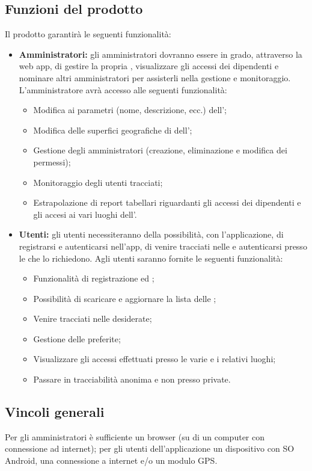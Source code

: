 \subsection{Funzioni del prodotto}
Il prodotto garantirà le seguenti funzionalità:
\begin{itemize}
    \item \textbf{Amministratori:} gli amministratori dovranno essere in grado, attraverso la web app, di gestire la propria , visualizzare gli accessi dei dipendenti e nominare altri amministratori per assisterli nella gestione e monitoraggio. \\
        L'amministratore avrà accesso alle seguenti funzionalità:
        \begin{itemize}
            \item Modifica ai parametri (nome, descrizione, ecc.) dell';
            \item Modifica delle superfici geografiche di  dell';
            \item Gestione degli amministratori (creazione, eliminazione e modifica dei permessi);
            \item Monitoraggio degli utenti tracciati;
            \item Estrapolazione di report tabellari riguardanti gli accessi dei dipendenti e gli accesi ai vari luoghi dell'.
        \end{itemize}
    \item \textbf{Utenti:} gli utenti necessiteranno della possibilità, con l'applicazione, di registrarsi e autenticarsi nell'app, di venire tracciati nelle  e autenticarsi presso le  che lo richiedono. Agli utenti saranno fornite le seguenti funzionalità:
    \begin{itemize}
        \item Funzionalità di registrazione ed ;
        \item Possibilità di scaricare e aggiornare la lista delle ;
        \item Venire tracciati nelle  desiderate;
        \item Gestione delle  preferite;
        \item Visualizzare gli accessi effettuati presso le varie  e i relativi luoghi;
        \item Passare in tracciabilità anonima e non presso  private.
    \end{itemize}
\end{itemize}
\subsection{Vincoli generali}
Per gli amministratori è sufficiente un browser (su di un computer con connessione ad internet); per gli utenti dell'applicazione un dispositivo con SO Android, una connessione a internet e/o un modulo GPS.